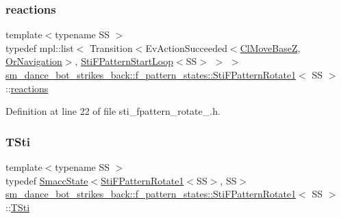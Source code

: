 \subsubsection{\texorpdfstring{reactions}{reactions}}
{\footnotesize\ttfamily template$<$typename SS $>$ \\
typedef mpl\+::list$<$ Transition$<$Ev\+Action\+Succeeded$<$\hyperlink{classmove__base__z__client_1_1ClMoveBaseZ}{Cl\+Move\+BaseZ}, \hyperlink{classsm__dance__bot__strikes__back_1_1OrNavigation}{Or\+Navigation}$>$, \hyperlink{structsm__dance__bot__strikes__back_1_1f__pattern__states_1_1StiFPatternStartLoop}{Sti\+F\+Pattern\+Start\+Loop}$<$SS$>$ $>$ $>$ \hyperlink{structsm__dance__bot__strikes__back_1_1f__pattern__states_1_1StiFPatternRotate1}{sm\+\_\+dance\+\_\+bot\+\_\+strikes\+\_\+back\+::f\+\_\+pattern\+\_\+states\+::\+Sti\+F\+Pattern\+Rotate1}$<$ SS $>$\+::\hyperlink{structsm__dance__bot__strikes__back_1_1f__pattern__states_1_1StiFPatternRotate1_aba05d27680e46c9e1c82162fef32ad32}{reactions}}



Definition at line 22 of file sti\+\_\+fpattern\+\_\+rotate\+\_.\+h.

\mbox{\label{structsm__dance__bot__strikes__back_1_1f__pattern__states_1_1StiFPatternRotate1_ac35c904f7bbee9538b86251490407684}} 
\subsubsection{\texorpdfstring{T\+Sti}{TSti}}
{\footnotesize\ttfamily template$<$typename SS $>$ \\
typedef \hyperlink{classSmaccState}{Smacc\+State}$<$\hyperlink{structsm__dance__bot__strikes__back_1_1f__pattern__states_1_1StiFPatternRotate1}{Sti\+F\+Pattern\+Rotate1}$<$SS$>$, SS$>$ \hyperlink{structsm__dance__bot__strikes__back_1_1f__pattern__states_1_1StiFPatternRotate1}{sm\+\_\+dance\+\_\+bot\+\_\+strikes\+\_\+back\+::f\+\_\+pattern\+\_\+states\+::\+Sti\+F\+Pattern\+Rotate1}$<$ SS $>$\+::\hyperlink{structsm__dance__bot__strikes__back_1_1f__pattern__states_1_1StiFPatternRotate1_ac35c904f7bbee9538b86251490407684}{T\+Sti}}



